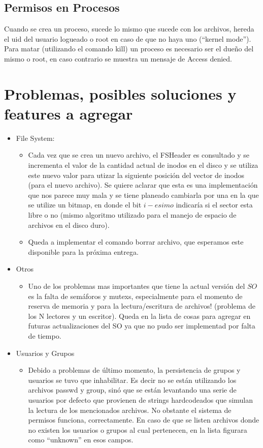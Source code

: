 \documentclass[english]{article}
\begin{document}
\subsection {Permisos en Procesos}
Cuando se crea un proceso, sucede lo mismo que sucede con los archivos, hereda el uid del usuario logueado o root en caso de que no haya uno (“kernel mode”).
Para matar (utilizando el comando kill) un proceso es necesario ser el dueño del mismo o root, en caso contrario se muestra un mensaje de Access denied.
 
\pagebreak{}

\section{Problemas, posibles soluciones y features a agregar}
\begin{itemize}
\item File System:

\begin{itemize}
\item Cada vez que se crea un nuevo archivo, el FSHeader es consultado y
se incrementa el valor de la cantidad actual de inodos en el disco
y se utiliza este nuevo valor para utizar la siguiente posición del
vector de inodos (para el nuevo archivo). Se quiere aclarar que esta
es una implementación que nos parece muy mala y se tiene planeado
cambiarla por una en la que se utilize un bitmap, en donde el bit
$i-esimo$ indicaría si el sector esta libre o no (mismo algoritmo
utilizado para el manejo de espacio de archivos en el disco duro). 
\item Queda a implementar el comando borrar archivo, que esperamos este disponible
para la próxima entrega.
\end{itemize}
\item Otros

\begin{itemize}
\item Uno de los problemas mas importantes que tiene la actual versión del
$SO$ es la falta de semáforos y mutexs, especialmente para el momento
de reserva de memoria y para la lectura/escritura de archivos! (problema
de los N lectores y un escritor). Queda en la lista de cosas para
agregar en futuras actualizaciones del SO ya que no pudo ser implementad
por falta de tiempo.
\end{itemize}

\item Usuarios y Grupos
\begin{itemize}
\item Debido a problemas de último momento, la persistencia de grupos y usuarios se tuvo que inhabilitar. Es decir no se están utilizando los archivos passwd y group, sinó que se están levantando una serie de usuarios por defecto que provienen de strings hardcodeados que simulan la lectura de los mencionados archivos. No obstante el sistema de permisos funciona, correctamente. En caso de que se listen archivos donde no existen los usuarios o grupos al cual pertenecen, en la lista figurara como “unknown” en esos campos.
\end{itemize}

\end{itemize}
\end{document}
